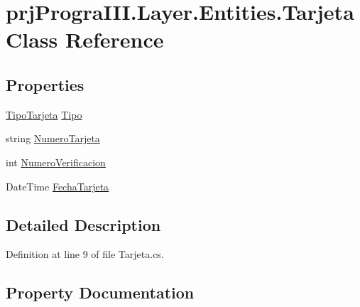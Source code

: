 \hypertarget{classprj_progra_i_i_i_1_1_layer_1_1_entities_1_1_tarjeta}{}\section{prj\+Progra\+I\+I\+I.\+Layer.\+Entities.\+Tarjeta Class Reference}
\label{classprj_progra_i_i_i_1_1_layer_1_1_entities_1_1_tarjeta}
\subsection*{Properties}
\begin{DoxyCompactItemize}
\item 
\hyperlink{_tipo_tarjeta_8cs_a7b9bee44d937449fa100c92d7402dcd9}{Tipo\+Tarjeta} \hyperlink{classprj_progra_i_i_i_1_1_layer_1_1_entities_1_1_tarjeta_a4f5e28b97fd18d6d1e67af6a3f043eb3}{Tipo}
\item 
string \hyperlink{classprj_progra_i_i_i_1_1_layer_1_1_entities_1_1_tarjeta_afc73d9bbe1a4f87a41604ef006657c03}{Numero\+Tarjeta}
\item 
int \hyperlink{classprj_progra_i_i_i_1_1_layer_1_1_entities_1_1_tarjeta_abf3fbc88505507f6dfe10177dd073dfc}{Numero\+Verificacion}
\item 
Date\+Time \hyperlink{classprj_progra_i_i_i_1_1_layer_1_1_entities_1_1_tarjeta_aa30576c72ce81b35771dba4aee2d4ea4}{Fecha\+Tarjeta}
\end{DoxyCompactItemize}


\subsection{Detailed Description}


Definition at line 9 of file Tarjeta.\+cs.



\subsection{Property Documentation}
\hypertarget{classprj_progra_i_i_i_1_1_layer_1_1_entities_1_1_tarjeta_aa30576c72ce81b35771dba4aee2d4ea4}{}\label{classprj_progra_i_i_i_1_1_layer_1_1_entities_1_1_tarjeta_aa30576c72ce81b35771dba4aee2d4ea4} 
